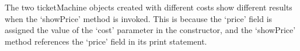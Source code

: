 The two ticketMachine objects created with different costs show
different results when the `showPrice' method is invoked. This is
because the `price' field is assigned the value of the `cost' parameter
in the constructor, and the `showPrice' method references the `price'
field in its print statement.
